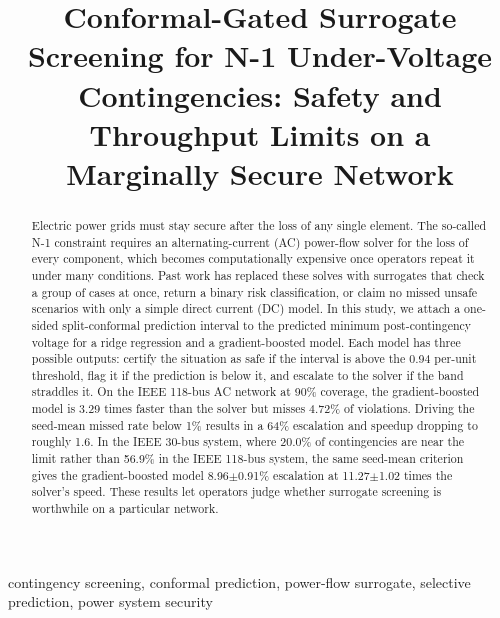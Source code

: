 \documentclass[conference]{IEEEtran}
\begin{document}
\title{Conformal-Gated Surrogate Screening for N-1 Under-Voltage Contingencies: Safety and Throughput Limits on a Marginally Secure Network}

\author{
\and
{}
}
\maketitle

\begin{abstract}
Electric power grids must stay secure after the loss of any single element. The so-called N-1 constraint requires an alternating-current (AC) power-flow solver for the loss of every component, which becomes computationally expensive once operators repeat it under many conditions. Past work has replaced these solves with surrogates that check a group of cases at once, return a binary risk classification, or claim no missed unsafe scenarios with only a simple direct current (DC) model. In this study, we attach a one-sided split-conformal prediction interval to the predicted minimum post-contingency voltage for a ridge regression and a gradient-boosted model. Each model has three possible outputs: certify the situation as safe if the interval is above the 0.94 per-unit threshold, flag it if the prediction is below it, and escalate to the solver if the band straddles it. On the IEEE 118-bus AC network at 90\% coverage, the gradient-boosted model is 3.29 times faster than the solver but misses 4.72\% of violations. Driving the seed-mean missed rate below 1\% results in a 64\% escalation and speedup dropping to roughly 1.6. In the IEEE 30-bus system, where 20.0\% of contingencies are near the limit rather than 56.9\% in the IEEE 118-bus system, the same seed-mean criterion gives the gradient-boosted model 8.96$\pm$0.91\% escalation at 11.27$\pm$1.02 times the solver's speed. These results let operators judge whether surrogate screening is worthwhile on a particular network.
\end{abstract}

\begin{IEEEkeywords}
contingency screening, conformal prediction, power-flow surrogate, selective prediction, power system security
\end{IEEEkeywords}
\end{document}
